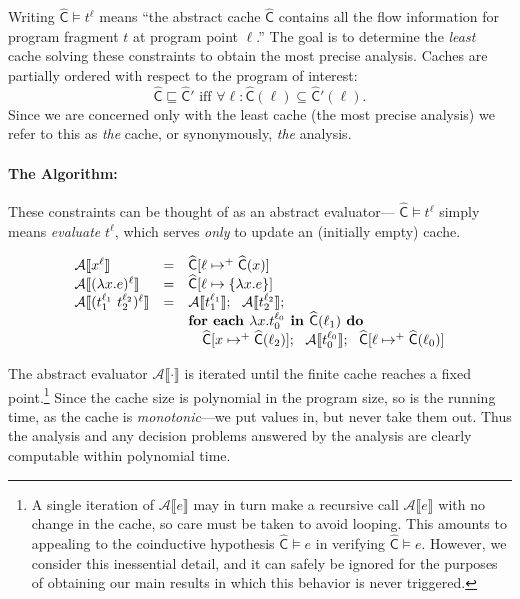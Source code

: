 \documentclass{llncs}
\newcommand\av[1]{\ensuremath{\mathcal{A}\sem{#1}}}
\newcommand\sem[1]{\ensuremath{\llbracket #1 \rrbracket}}
\newcommand\cache{\widehat{\mathsf{C}}}
\begin{document}
Writing $\cache \models t^\ell$ means ``the abstract cache $\cache$
contains all the flow information for program fragment $t$ at program
point $\ell$.''  The goal is to determine the {\em least} cache
solving these constraints to obtain the most precise analysis. Caches
are partially ordered with respect to the program of interest:
\begin{displaymath}
\cache \sqsubseteq \cache' \mbox{ iff } \forall \ell : \cache(\ell) \subseteq \cache'(\ell).
\end{displaymath}
Since we are concerned only with the least cache (the most precise
analysis) we refer to this as {\em the} cache, or synonymously, {\em
the} analysis.

\paragraph{The Algorithm:}

These constraints can be thought of as an abstract evaluator---
$\cache \models t^\ell$ simply means {\em evaluate} $t^\ell$, which
serves {\em only} to update an (initially empty) cache.

\begin{displaymath}
\begin{array}{lcl}
\av{x^\ell}               & = & \cache[\ell \mapsto^+ \cache(x)]\\
\av{(\lambda x.e)^\ell} & = & \cache[\ell \mapsto \{ \lambda x.e \}]\\
\av{(t^{\ell_1}_1\ t^{\ell_2}_2)^\ell} & = & \av{t^{\ell_1}_1};\ \ \av{t^{\ell_2}_2};\\
\ &\ & \mbox{\bf for each }\lambda x.t^{\ell_0}_0 \mbox{\bf\ in } \cache(\ell_1)\mbox{\bf\ do }\\
\ &\ &   \quad   \cache[x \mapsto^+ \cache(\ell_2)];\ \ 
                 \av{t^{\ell_0}_0};\ \
                 \cache[\ell \mapsto^+\cache(\ell_0)]
\end{array}
\end{displaymath}

The abstract evaluator $\av\cdot$ is iterated until the finite cache
reaches a fixed point.\footnote{\label{fn:fineprint}A single iteration
of $\av{e}$ may in turn make a recursive call $\av{e}$ with no change
in the cache, so care must be taken to avoid looping.  This amounts to
appealing to the coinductive hypothesis $\cache \models e$ in
verifying $\cache \models e$.  However, we consider this inessential
detail, and it can safely be ignored for the purposes of obtaining our
main results in which this behavior is never triggered.}  Since the
cache size is polynomial in the program size, so is the running time,
as the cache is {\em monotonic}---we put values in, but never take
them out.  Thus the analysis and any decision problems answered by the
analysis are clearly computable within polynomial time.
\end{document}
